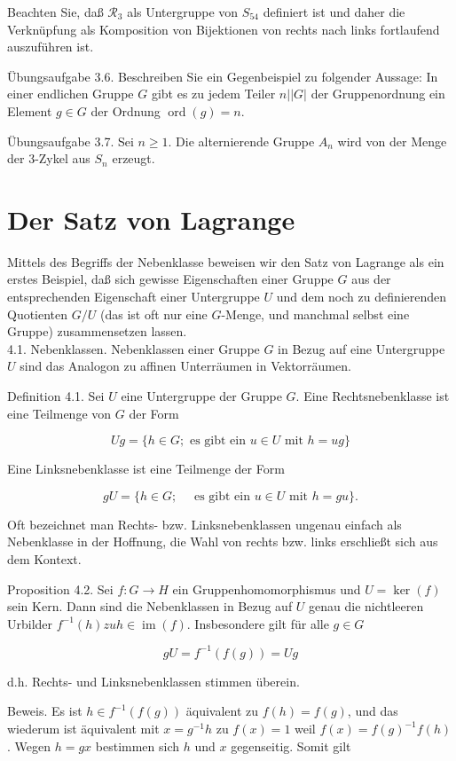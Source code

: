 \documentclass[10pt, letterpaper]{article}
\begin{document}
Beachten Sie, daß $\mathscr{R}_{3}$ als Untergruppe von $S_{54}$ definiert ist und daher die Verknüpfung als Komposition von Bijektionen von rechts nach links fortlaufend auszuführen ist.

Übungsaufgabe 3.6. Beschreiben Sie ein Gegenbeispiel zu folgender Aussage: In einer endlichen Gruppe $G$ gibt es zu jedem Teiler $n||G|$ der Gruppenordnung ein Element $g \in G$ der Ordnung $\operatorname{ord}(g)=n$.

Übungsaufgabe 3.7. Sei $n \geq 1$. Die alternierende Gruppe $A_{n}$ wird von der Menge der 3-Zykel aus $S_{n}$ erzeugt.

\section*{Der Satz von Lagrange}
Mittels des Begriffs der Nebenklasse beweisen wir den Satz von Lagrange als ein erstes Beispiel, daß sich gewisse Eigenschaften einer Gruppe $G$ aus der entsprechenden Eigenschaft einer Untergruppe $U$ und dem noch zu definierenden Quotienten $G / U$ (das ist oft nur eine $G$-Menge, und manchmal selbst eine Gruppe) zusammensetzen lassen.\\
4.1. Nebenklassen. Nebenklassen einer Gruppe $G$ in Bezug auf eine Untergruppe $U$ sind das Analogon zu affinen Unterräumen in Vektorräumen.

Definition 4.1. Sei $U$ eine Untergruppe der Gruppe $G$. Eine Rechtsnebenklasse ist eine Teilmenge von $G$ der Form

$$
U g=\{h \in G ; \text { es gibt ein } u \in U \text { mit } h=u g\}
$$

Eine Linksnebenklasse ist eine Teilmenge der Form

$$
g U=\{h \in G ; \quad \text { es gibt ein } u \in U \text { mit } h=g u\} .
$$

Oft bezeichnet man Rechts- bzw. Linksnebenklassen ungenau einfach als Nebenklasse in der Hoffnung, die Wahl von rechts bzw. links erschließt sich aus dem Kontext.

Proposition 4.2. Sei $f: G \rightarrow H$ ein Gruppenhomomorphismus und $U=\operatorname{ker}(f)$ sein Kern. Dann sind die Nebenklassen in Bezug auf $U$ genau die nichtleeren Urbilder $f^{-1}(h) z u h \in \operatorname{im}(f)$. Insbesondere gilt für alle $g \in G$

$$
g U=f^{-1}(f(g))=U g
$$

d.h. Rechts- und Linksnebenklassen stimmen überein.

Beweis. Es ist $h \in f^{-1}(f(g))$ äquivalent zu $f(h)=f(g)$, und das wiederum ist äquivalent mit $x=g^{-1} h$ zu $f(x)=1$ weil $f(x)=f(g)^{-1} f(h)$. Wegen $h=g x$ bestimmen sich $h$ und $x$ gegenseitig. Somit gilt
\end{document}
